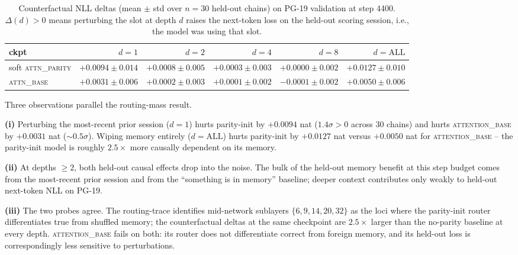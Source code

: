 \documentclass{article}
\begin{document}
\begin{table}[t]
\centering
\caption{Counterfactual NLL deltas (mean $\pm$ std over $n=30$
held-out chains) on PG-19 validation at step 4400. $\Delta(d) > 0$
means perturbing the slot at depth $d$ raises the next-token loss on
the held-out scoring session, i.e., the model was using that slot.}
\label{tab:counterfactual}
\small
\setlength{\tabcolsep}{4pt}
\begin{tabular}{lrrrrr}
\toprule
ckpt & $d{=}1$ & $d{=}2$ & $d{=}4$ & $d{=}8$ & $d{=}\mathrm{ALL}$ \\
\midrule
soft \textsc{attn\_parity} & $+0.0094 \pm 0.014$ & $+0.0008 \pm 0.005$ & $+0.0003 \pm 0.003$ & $+0.0000 \pm 0.002$ & $+0.0127 \pm 0.010$ \\
\textsc{attn\_base}        & $+0.0031 \pm 0.006$ & $+0.0002 \pm 0.003$ & $+0.0001 \pm 0.002$ & $-0.0001 \pm 0.002$ & $+0.0050 \pm 0.006$ \\
\bottomrule
\end{tabular}
\end{table}

Three observations parallel the routing-mass result.

\textbf{(i)} Perturbing the most-recent prior session ($d=1$) hurts
parity-init by $+0.0094$ nat ($1.4\sigma > 0$ across $30$ chains)
and hurts \textsc{attention\_base} by $+0.0031$ nat
($\sim 0.5\sigma$). Wiping memory entirely ($d=\mathrm{ALL}$) hurts
parity-init by $+0.0127$ nat versus $+0.0050$ nat for
\textsc{attention\_base} -- the parity-init model is roughly
$2.5\times$ more causally dependent on its memory.

\textbf{(ii)} At depths $\geq 2$, both held-out causal effects drop
into the noise. The bulk of the held-out memory benefit at this step
budget comes from the most-recent prior session and from the
``something is in memory'' baseline; deeper context contributes only
weakly to held-out next-token NLL on PG-19.

\textbf{(iii)} The two probes agree. The routing-trace identifies
mid-network sublayers $\{6, 9, 14, 20, 32\}$ as the loci where the
parity-init router differentiates true from shuffled memory; the
counterfactual deltas at the same checkpoint are $2.5\times$ larger
than the no-parity baseline at every depth. \textsc{attention\_base}
fails on both: its router does not differentiate correct from foreign
memory, and its held-out loss is correspondingly less sensitive to
perturbations.
\end{document}
